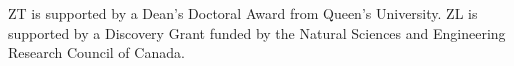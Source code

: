 ZT is supported by a Dean’s Doctoral Award from Queen’s University. ZL is supported by a Discovery Grant funded by the Natural Sciences and Engineering Research Council of Canada.



\address{Zhiwen Tan\\
  Department of Public Health Sciences\\
  Queen's University}

\address{Chang Shen\\
  Department of Electrical and Computer Engineering\\
  Queen's University}

\address{Zihang Lu\\
  Department of Public Health Sciences\\
  \emph{and} Department of Mathematics and Statistics\\
  Queen's University\\
  }
